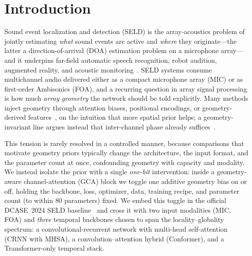 \section{Introduction}
\label{sec:intro}

Sound event localization and detection (SELD) is the array-acoustics problem of
jointly estimating \emph{what} sound events are active and \emph{where} they
originate---the latter a direction-of-arrival (DOA) estimation problem on a
microphone array---and it underpins far-field automatic speech recognition,
robot audition, augmented reality, and acoustic
monitoring~\cite{adavanne2018seld,politis2020overview}. SELD systems consume
multichannel audio delivered either as a compact microphone array (MIC) or as
first-order Ambisonics (FOA), and a recurring question in array signal
processing is how much \emph{array geometry} the network should be told
explicitly. Many methods inject geometry through attention biases, positional
encodings, or geometry-derived features~\cite{kowalk2022geometry}, on the
intuition that more spatial prior helps; a geometry-invariant line argues instead
that inter-channel phase already suffices~\cite{baek2025gidoaenet,neuralsrp2024}.

This tension is rarely resolved in a controlled manner, because comparisons that
motivate geometry priors typically change the architecture, the input format,
and the parameter count at once, confounding geometry with capacity and
modality. We instead isolate the prior with a single \emph{one-bit} intervention:
inside a geometry-aware channel-attention (GCA) block we toggle one additive
geometry bias on or off, holding the backbone, loss, optimizer, data, training
recipe, and parameter count (to within $80$ parameters) fixed. We embed this
toggle in the official DCASE~2024 SELD baseline~\cite{krause2024sde} and cross it
with two input modalities (MIC, FOA) and \emph{three} temporal backbones chosen
to span the locality--globality spectrum: a convolutional-recurrent network with
multi-head self-attention (CRNN with MHSA), a convolution--attention hybrid
(Conformer), and a Transformer-only temporal stack.


